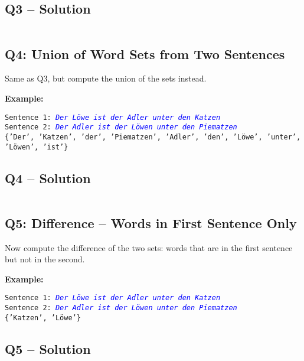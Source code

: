 \documentclass[a4paper,11pt]{article}
\begin{document}
\subsection*{Q3 – Solution}
\inputminted{python}{Files/9/3.py}

\subsection*{Q4: Union of Word Sets from Two Sentences}
Same as Q3, but compute the union of the sets instead.

\textbf{Example:}
\begin{flushleft}
	\texttt{Sentence 1: \textcolor{blue}{\textit{Der Löwe ist der Adler unter den Katzen}}}\\
	\texttt{Sentence 2: \textcolor{blue}{\textit{Der Adler ist der Löwen unter den Piematzen}}}\\
	\texttt{\{'Der', 'Katzen', 'der', 'Piematzen', 'Adler', 'den', 'Löwe', 'unter', 'Löwen', 'ist'\}}
\end{flushleft}

\subsection*{Q4 – Solution}
\inputminted{python}{Files/9/4.py}

\subsection*{Q5: Difference – Words in First Sentence Only}
Now compute the difference of the two sets: words that are in the first sentence but not in the second.

\textbf{Example:}
\begin{flushleft}
	\texttt{Sentence 1: \textcolor{blue}{\textit{Der Löwe ist der Adler unter den Katzen}}}\\
	\texttt{Sentence 2: \textcolor{blue}{\textit{Der Adler ist der Löwen unter den Piematzen}}}\\
	\texttt{\{'Katzen', 'Löwe'\}}
\end{flushleft}

\subsection*{Q5 – Solution}
\inputminted{python}{Files/9/5.py}


	
	
\end{document}

